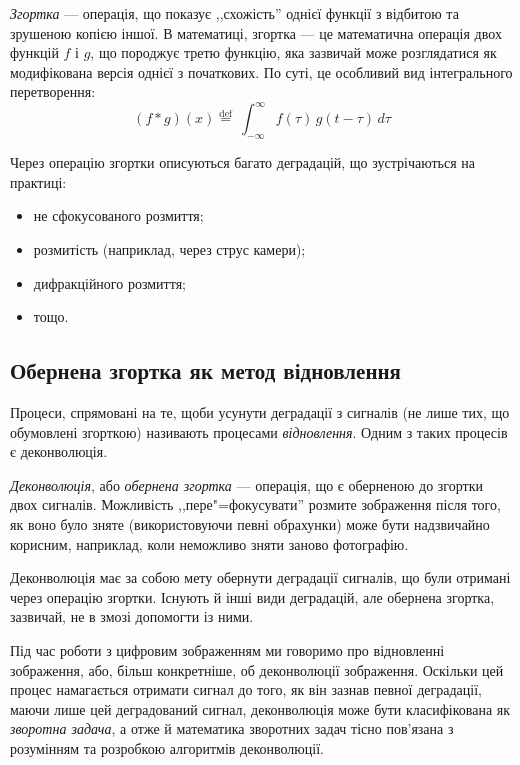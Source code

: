\documentclass[simple,14pt,utf8,ukrainian]{eskdtext}
\begin{document}
    \emph{Згортка} --- операція, що показує ,,схожість'' однієї функції з
    відбитою та зрушеною копією іншої.
    В математиці, згортка --- це математична операція двох функцій $f$ і $g$, що
    породжує третю функцію, яка зазвичай може розглядатися як модифікована
    версія однієї з початкових.
    По суті, це особливий вид інтегрального перетворення:
    \[
      \left( f * g \right)\left( x \right) \stackrel{\mathrm{def}}{=}\
      \int_{-\infty}^\infty f(\tau)\, g(t - \tau)\, d\tau
    \]

    Через операцію згортки описуються багато деградацій, що зустрічаються на
    практиці:
    \begin{itemize}
      \item не сфокусованого розмиття;
      \item розмитість (наприклад, через струс камери);
      \item дифракційного розмиття;
      \item тощо.
    \end{itemize}
    \clearpage

  \subsection{Обернена згортка як метод відновлення}

    Процеси, спрямовані на те, щоби усунути деградації з сигналів (не лише тих,
    що обумовлені згорткою) називають процесами \emph{відновлення}.
    Одним з таких процесів є деконволюція.

    \emph{Деконволюція}, або \emph{обернена згортка} --- операція, що є
    оберненою до згортки двох сигналів.
    Можливість ,,пере"=фокусувати'' розмите зображення після того, як воно було
    зняте (використовуючи певні обрахунки) може бути надзвичайно корисним,
    наприклад, коли неможливо зняти заново фотографію.

    Деконволюція має за собою мету обернути деградації сигналів, що були
    отримані через операцію згортки.
    Існують й інші види деградацій, але обернена згортка, зазвичай, не в змозі
    допомогти із ними.

    Під час роботи з цифровим зображенням ми говоримо про відновленні зображення,
    або, більш конкретніше, об деконволюції зображення.
    Оскільки цей процес намагається отримати сигнал до того, як він зазнав
    певної деградації, маючи лише цей деградований сигнал, деконволюція може
    бути класифікована як \emph{зворотна задача}, а отже й математика зворотних
    задач тісно пов’язана з розумінням та розробкою алгоритмів деконволюції.
\end{document}
